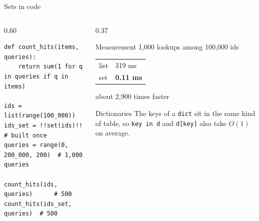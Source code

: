 \documentclass[aspectratio=169,11pt]{beamer}
\begin{document}
\begin{frame}[fragile]{Sets in code}
  \begin{columns}[T,onlytextwidth]
  \begin{column}{0.60\textwidth}
\begin{lstlisting}
def count_hits(items, queries):
    return sum(1 for q in queries if q in items)

ids = list(range(100_000))
ids_set = !!set(ids)!!                # built once
queries = range(0, 200_000, 200)  # 1,000 queries

count_hits(ids, queries)      # 500
count_hits(ids_set, queries)  # 500
\end{lstlisting}
  \end{column}
  \begin{column}{0.37\textwidth}
    \begin{block}{Measurement}
      1,000 lookups among 100,000 ids\par\smallskip
      \begin{tabular}{@{}ll@{}}
        list & 319 ms\\
        set & \textbf{0.11 ms}\\
      \end{tabular}\par\smallskip
      about 2,900 times faster
    \end{block}
    \begin{block}{Dictionaries}
      The keys of a \texttt{dict} sit in the same kind of table, so \texttt{key in d} and
      \texttt{d[key]} also take $O(1)$ on average.
    \end{block}
  \end{column}
  \end{columns}
\end{frame}
\end{document}

